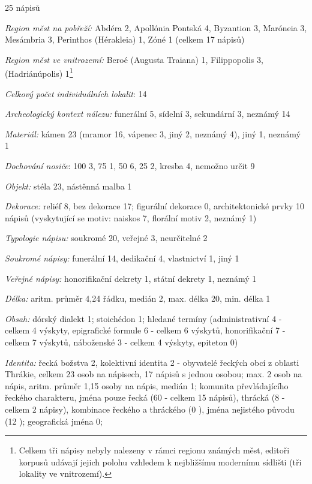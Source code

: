 \placetable[none]{}
\starttable[|l|]
\HL
{} 25 nápisů

{\em Region měst na pobřeží:} Abdéra 2, Apollónia Pontská 4, Byzantion 3, Maróneia 3, Mesámbria 3, Perinthos (Hérakleia) 1, Zóné 1 (celkem 17 nápisů)

{\em Region měst ve vnitrozemí:} Beroé (Augusta Traiana) 1, Filippopolis 3, (Hadriánúpolis) 1\footnote{Celkem tři nápisy nebyly nalezeny v rámci regionu známých měst, editoři korpusů udávají jejich polohu vzhledem k nejbližšímu modernímu sídlišti (tři lokality ve vnitrozemí).}

{\em Celkový počet individuálních lokalit}: 14

{\em Archeologický kontext nálezu:} funerální 5, sídelní 3, sekundární 3, neznámý 14

{\em Materiál:} kámen 23 (mramor 16, vápenec 3, jiný 2, neznámý 4), jiný 1, neznámý 1

{\em Dochování nosiče}: 100  3, 75  1, 50  6, 25  2, kresba 4, nemožno určit 9

{\em Objekt:} stéla 23, nástěnná malba 1

{\em Dekorace:} reliéf 8, bez dekorace 17; figurální dekorace 0, architektonické prvky 10 nápisů (vyskytující se motiv: naiskos 7, florální motiv 2, neznámý 1)

{\em Typologie nápisu:} soukromé 20, veřejné 3, neurčitelné 2

{\em Soukromé nápisy:} funerální 14, dedikační 4, vlastnictví 1, jiný 1

{\em Veřejné nápisy:} honorifikační dekrety 1, státní dekrety 1, neznámý 1

{\em Délka:} aritm. průměr 4,24 řádku, medián 2, max. délka 20, min. délka 1

{\em Obsah:} dórský dialekt 1; stoichédon 1; hledané termíny (administrativní 4 - celkem 4 výskyty, epigrafické formule 6 - celkem 6 výskytů, honorifikační 7 - celkem 7 výskytů, náboženské 3 - celkem 4 výskyty, epiteton 0)

{\em Identita:} řecká božstva 2, kolektivní identita 2 - obyvatelé řeckých obcí z oblasti Thrákie, celkem 23 osob na nápisech, 17 nápisů s jednou osobou; max. 2 osob na nápis, aritm. průměr 1,15 osoby na nápis, medián 1; komunita převládajícího řeckého charakteru, jména pouze řecká (60  - celkem 15 nápisů), thrácká (8  - celkem 2 nápisy), kombinace řeckého a thráckého (0 ), jména nejistého původu (12 ); geografická jména 0;

